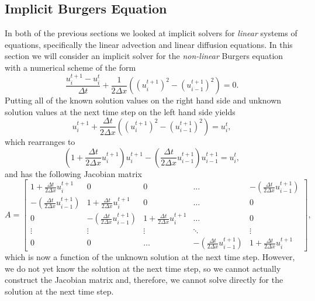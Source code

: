 \subsection{Implicit Burgers Equation}
In both of the previous sections we looked at implicit solvers for {\it linear} systems of equations, specifically the linear advection and linear diffusion equations. In this section we will consider an implicit solver for the {\it non-linear} Burgers equation with a numerical scheme of the form
\begin{equation}
	\frac{u_i^{t+1} - u_{i}^t}{\Delta t} + \frac{1}{2\Delta x}\left( \left(u_i^{t+1} \right)^2 - \left( u_{i-1}^{t+1} \right)^2 \right) =  0.
\end{equation}
Putting all of the known solution values on the right hand side and unknown solution values at the next time step on the left hand side yields
\begin{equation}
	u_i^{t+1} + \frac{\Delta t}{2\Delta x}\left( \left(u_i^{t+1} \right)^2 - \left( u_{i-1}^{t+1} \right)^2 \right) =  u_{i}^t,
\end{equation}
which rearranges to
\begin{equation}
	\left(1 + \frac{\Delta t}{2\Delta x}u_i^{t+1} \right)u_i^{t+1} - \left(\frac{\Delta t}{2\Delta x} u_{i-1}^{t+1}\right) u_{i-1}^{t+1}  =  u_{i}^t,
\end{equation}
and has the following Jacobian matrix
\begin{equation}
	A = 
	\begin{bmatrix}
	    1 + \frac{\Delta t}{2\Delta x}u_i^{t+1} & 0 & 0 & \dots  & - \left(\frac{\Delta t}{2\Delta x} u_{i-1}^{t+1}\right) \\
	    - \left(\frac{\Delta t}{2\Delta x} u_{i-1}^{t+1}\right) & 1 + \frac{\Delta t}{2\Delta x}u_i^{t+1} & 0 & \dots  & 0 \\
			0 & - \left(\frac{\Delta t}{2\Delta x} u_{i-1}^{t+1}\right) & 1 + \frac{\Delta t}{2\Delta x}u_i^{t+1} & \dots  & 0 \\
	    \vdots & \vdots & \vdots & \ddots & \vdots \\
	    0 & 0 & \dots & - \left(\frac{\Delta t}{2\Delta x} u_{i-1}^{t+1}\right)  & 1 + \frac{\Delta t}{2\Delta x}u_i^{t+1}
	\end{bmatrix},
\end{equation}
which is now a function of the unknown solution at the next time step. However, we do not yet know the solution at the next time step, so we cannot actually construct the Jacobian matrix and, therefore, we cannot solve directly for the solution at the next time step.

